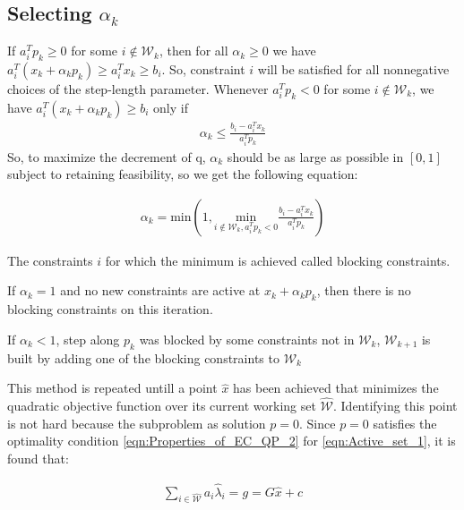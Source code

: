 \subsection*{Selecting $\alpha_k$}
If $a_{i}^{T}p_{k} \geqslant 0$ for some $i\notin \mathcal{W}_k$, then for all $\alpha_k \geqslant 0$ we have $a_{i}^T(x_k+\alpha_kp_k)\geqslant a_{i}^Tx_k \geqslant b_i$. So, constraint $i$ will be satisfied for all nonnegative choices of the step-length parameter. Whenever $a_i^Tp_k < 0$ for some $i\notin \mathcal{W}_k$, we have  $a_{i}^T(x_k+\alpha_kp_k) \geqslant b_i$ only if
\begin{equation*}
	\begin{aligned}
		\alpha_k \leqslant \frac{b_i-a_i^Tx_k}{a_i^Tp_k}
	\end{aligned}
\end{equation*}
So, to maximize the decrement of q, $\alpha_k$ should be as large as possible in $[0,1]$ subject to retaining feasibility, so we get the following equation:

\begin{equation}
	\begin{aligned}
		\alpha_k = {\text{min}} \left( 1, \underset{i\notin \mathcal{W}_k,a_i^Tp_k<0 }{\text{min}} \frac{b_i-a_i^Tx_k}{a_i^Tp_k} \right) 
	\end{aligned}
	\label{eqn:Active_set_3}
\end{equation}

The constraints $i$ for which the minimum is achieved called blocking constraints. 

If $\alpha_k = 1$ and no new constraints are active at $ x_k+\alpha_kp_k $, then there is no blocking constraints on this iteration. 

If $\alpha_k < 1$, step along $p_k$ was blocked by some constraints not in $\mathcal{W}_k$, $\mathcal{W}_{k+1}$ is built by adding one of the blocking constraints to $\mathcal{W}_k$

This method is repeated untill a point $\hat{x}$ has been achieved that minimizes the quadratic objective function over its current working set $\hat{\mathcal{W}}$. Identifying this point is not hard because the subproblem as solution $p=0$. Since $p=0$ satisfies the optimality condition \ref{eqn:Properties_of_EC_QP_2} for \ref{eqn:Active_set_1}, it is found that:

\begin{equation}
	\begin{aligned}
		\underset{i\in \hat{\mathcal{W}}}{\sum}a_i\hat{\lambda}_i = g = G\hat{x}+c
	\end{aligned}
	\label{eqn:Active_set_4}
\end{equation}

